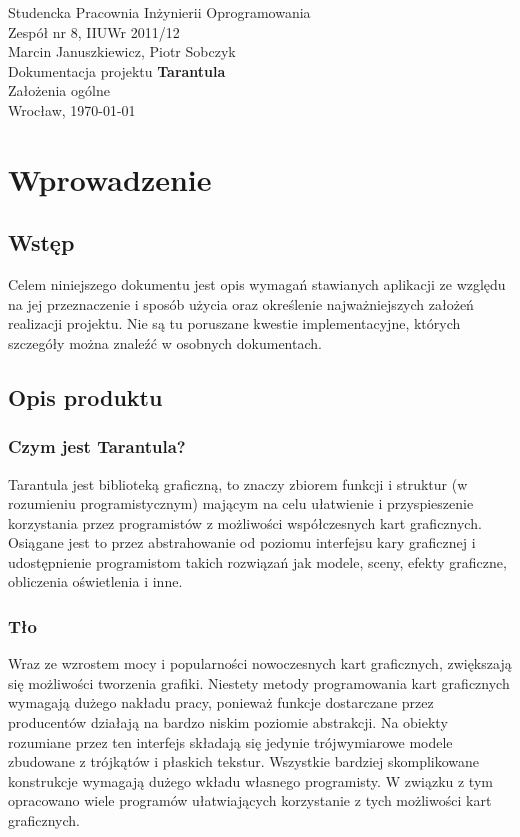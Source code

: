 \documentclass[11pt,leqno]{article}
\begin{document}
\begin{center}
\thispagestyle{empty}
{\Large Studencka Pracownia Inżynierii Oprogramowania}\\[0.5cm]
{\Large Zespół nr 8, IIUWr 2011/12}\\[2.5cm]

{\large Marcin Januszkiewicz, Piotr Sobczyk}\\[0.5cm]
{\huge Dokumentacja projektu \textbf{Tarantula}}\\[0.5cm]
{\huge Założenia ogólne}\\[0.5cm]
\vfill
{\large Wrocław, \today}
\end{center}
\newpage
\tableofcontents

\newpage


\newpage
\section{Wprowadzenie}

\subsection{Wstęp}
\noindent
Celem niniejszego dokumentu jest opis wymagań stawianych aplikacji ze względu na jej przeznaczenie i 
sposób użycia oraz określenie najważniejszych założeń realizacji projektu. 
Nie są tu poruszane kwestie implementacyjne, których szczegóły można znaleźć w osobnych dokumentach.

\subsection{Opis produktu}

\subsubsection{Czym jest Tarantula?}
\noindent
Tarantula jest biblioteką graficzną, to znaczy zbiorem funkcji i struktur (w rozumieniu programistycznym) mającym 
na celu ułatwienie i przyspieszenie korzystania przez programistów z możliwości współczesnych kart graficznych. 
Osiągane jest to przez abstrahowanie od poziomu interfejsu kary graficznej i udostępnienie programistom takich rozwiązań jak modele, sceny, efekty graficzne, obliczenia oświetlenia i inne.

\subsubsection{Tło}
\noindent
Wraz ze wzrostem mocy i popularności nowoczesnych kart graficznych, zwiększają się możliwości tworzenia grafiki. 
Niestety metody programowania kart graficznych wymagają dużego nakładu pracy, ponieważ funkcje dostarczane przez producentów 
działają na bardzo niskim poziomie abstrakcji. Na obiekty rozumiane przez ten interfejs składają się jedynie trójwymiarowe modele zbudowane z trójkątów i płaskich tekstur. 
Wszystkie bardziej skomplikowane konstrukcje wymagają dużego wkładu własnego programisty. W związku z tym opracowano wiele programów 
ułatwiających korzystanie z tych możliwości kart graficznych. 
\end{document}

